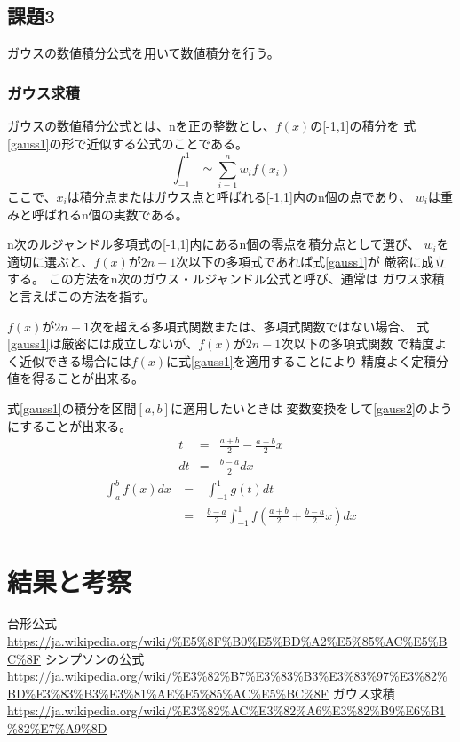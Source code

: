 \documentclass[dvipdfmx]{jsarticle}
\begin{document}
\subsection{課題3}
ガウスの数値積分公式を用いて数値積分を行う。
\subsubsection{ガウス求積}
ガウスの数値積分公式とは、nを正の整数とし、$f(x)$の[-1,1]の積分を
式\ref{gauss1}の形で近似する公式のことである。
\begin{equation}
  \int_{-1}^{1} \simeq \sum_{i=1}^{n} w_i f(x_i)
  \label{gauss1}
\end{equation}
ここで、$x_i$は積分点またはガウス点と呼ばれる[-1,1]内のn個の点であり、
$w_i$は重みと呼ばれるn個の実数である。

n次のルジャンドル多項式の[-1,1]内にあるn個の零点を積分点として選び、
$w_i$を適切に選ぶと、$f(x)$が$2n-1$次以下の多項式であれば式\ref{gauss1}が
厳密に成立する。
この方法をn次のガウス・ルジャンドル公式と呼び、通常は
ガウス求積と言えばこの方法を指す。

$f(x)$が$2n-1$次を超える多項式関数または、多項式関数ではない場合、
式\ref{gauss1}は厳密には成立しないが、$f(x)$が$2n-1$次以下の多項式関数
で精度よく近似できる場合には$f(x)$に式\ref{gauss1}を適用することにより
精度よく定積分値を得ることが出来る。

式\ref{gauss1}の積分を区間$[a,b]$に適用したいときは
変数変換をして\ref{gauss2}のようにすることが出来る。
\begin{eqnarray}
  t &=& \frac{a+b}{2} - \frac{a-b}{2}x \nonumber \\
  dt &=& \frac{b-a}{2}dx \nonumber
\end{eqnarray}
\begin{eqnarray}
  \int_a^b f(x)dx ~&=&~ \int_{-1}^{1} g(t)dt \\
  &=&~ \frac{b-a}{2}\int_{-1}^{1} f(\frac{a+b}{2} + \frac{b-a}{2}x)dx
  \label{gauss2}
\end{eqnarray}

\section{結果と考察}

\begin{thebibliography}{10}
   台形公式
  \url{https://ja.wikipedia.org/wiki/%E5%8F%B0%E5%BD%A2%E5%85%AC%E5%BC%8F}
   シンプソンの公式
  \url{https://ja.wikipedia.org/wiki/%E3%82%B7%E3%83%B3%E3%83%97%E3%82%BD%E3%83%B3%E3%81%AE%E5%85%AC%E5%BC%8F}
   ガウス求積
  \url{https://ja.wikipedia.org/wiki/%E3%82%AC%E3%82%A6%E3%82%B9%E6%B1%82%E7%A9%8D}

\end{thebibliography}
\end{document}
